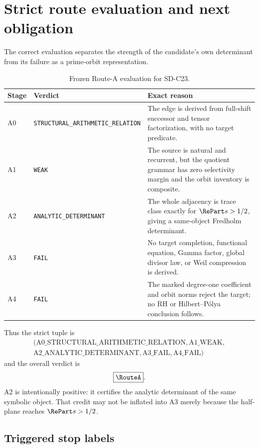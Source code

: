 \section{Strict route evaluation and next obligation}
\label{sec:route}

The correct evaluation separates the strength of the candidate's own
determinant from its failure as a prime-orbit representation.

\begin{table}[t]
\centering
\small
\caption{Frozen Route-A evaluation for SD-C23.}
\label{tab:route}
\begin{tabularx}{\textwidth}{@{}L{0.12\textwidth}L{0.34\textwidth}Y@{}}
\toprule
Stage & Verdict & Exact reason\\
\midrule
A0
 & {\scriptsize\texttt{STRUCTURAL\_ARITHMETIC\_RELATION}}
 & The edge is derived from full-shift successor and tensor factorization,
   with no target predicate.\\
A1
 & \texttt{WEAK}
 & The source is natural and recurrent, but the quotient grammar has zero
   selectivity margin and the orbit inventory is composite.\\
A2
 & \texttt{ANALYTIC\_DETERMINANT}
 & The whole adjacency is trace class exactly for
   \(\RePart s>1/2\), giving a same-object Fredholm determinant.\\
A3
 & \texttt{FAIL}
 & No target completion, functional equation, Gamma factor, global divisor
   law, or Weil compression is derived.\\
A4
 & \texttt{FAIL}
 & The marked degree-one coefficient and orbit norms reject the target; no
   RH or Hilbert--Pólya conclusion follows.\\
\bottomrule
\end{tabularx}
\end{table}

Thus the strict tuple is
\[
\boxed{
\begin{gathered}
(\mathrm{A0\_STRUCTURAL\_ARITHMETIC\_RELATION},
 \mathrm{A1\_WEAK},\\
 \mathrm{A2\_ANALYTIC\_DETERMINANT},
 \mathrm{A3\_FAIL},
 \mathrm{A4\_FAIL})
\end{gathered}}
\]
and the overall verdict is
\[
\boxed{\RouteA}.
\]
A2 is intentionally positive: it certifies the analytic determinant of the
same symbolic object.  That credit may not be inflated into A3 merely because
the half-plane reaches \(\RePart s>1/2\).

\subsection{Triggered stop labels}

